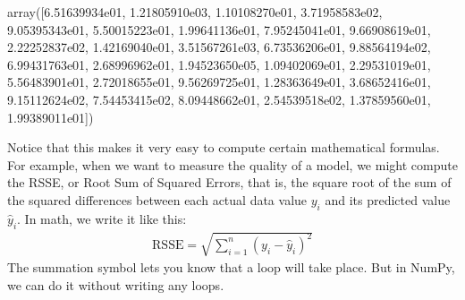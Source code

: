 \documentclass[letterpaper,10pt,english]{sphinxmanual}
\begin{document}
\begin{sphinxVerbatim}[commandchars=\\\{\}]
   
\end{sphinxVerbatim}

\begin{sphinxVerbatim}[commandchars=\\\{\}]
array([6.51639934e\PYGZhy{}01, 1.21805910e\PYGZhy{}03, 1.10108270e\PYGZhy{}01, 3.71958583e\PYGZhy{}02,
       9.05395343e\PYGZhy{}01, 5.50015223e\PYGZhy{}01, 1.99641136e\PYGZhy{}01, 7.95245041e\PYGZhy{}01,
       9.66908619e\PYGZhy{}01, 2.22252837e\PYGZhy{}02, 1.42169040e\PYGZhy{}01, 3.51567261e\PYGZhy{}03,
       6.73536206e\PYGZhy{}01, 9.88564194e\PYGZhy{}02, 6.99431763e\PYGZhy{}01, 2.68996962e\PYGZhy{}01,
       1.94523650e\PYGZhy{}05, 1.09402069e\PYGZhy{}01, 2.29531019e\PYGZhy{}01, 5.56483901e\PYGZhy{}01,
       2.72018655e\PYGZhy{}01, 9.56269725e\PYGZhy{}01, 1.28363649e\PYGZhy{}01, 3.68652416e\PYGZhy{}01,
       9.15112624e\PYGZhy{}02, 7.54453415e\PYGZhy{}02, 8.09448662e\PYGZhy{}01, 2.54539518e\PYGZhy{}02,
       1.37859560e\PYGZhy{}01, 1.99389011e\PYGZhy{}01])
\end{sphinxVerbatim}

Notice that this makes it very easy to compute certain mathematical formulas.  For example, when we want to measure the quality of a model, we might compute the RSSE, or Root Sum of Squared Errors, that is, the square root of the sum of the squared differences between each actual data value \(y_i\) and its predicted value \(\hat y_i\).  In math, we write it like this:
\begin{equation*}
\begin{split} \text{RSSE} = \sqrt{\sum_{i=1}^n (y_i-\hat y_i)^2} \end{split}
\end{equation*}
The summation symbol lets you know that a loop will take place.  But in NumPy, we can do it without writing any loops.

\begin{sphinxVerbatim}[commandchars=\\\{\}]
      \PYG{p}{[}      \PYG{p}{]}    
   \PYG{p}{[}      \PYG{p}{]}    
           
\end{sphinxVerbatim}
\end{document}
